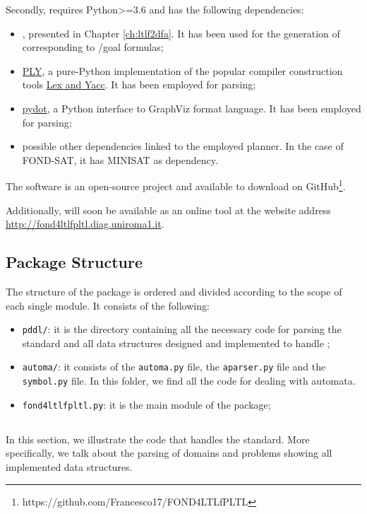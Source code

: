 Secondly, \FONDFOR requires Python>=3.6 and has the following dependencies:
\begin{itemize}
\item \LTLfToDFA, presented in Chapter \ref{ch:ltlf2dfa}. It has been used for the generation of \DFAs corresponding to \LTLf/\PLTL goal formulas;
\item \href{http://www.dabeaz.com/ply/ply.html}{PLY}, a pure-Python implementation of the popular compiler construction tools \href{http://dinosaur.compilertools.net/}{Lex and Yacc}. It has been employed for \PDDL parsing;
\item \href{https://pypi.org/project/pydot/}{pydot}, a Python interface to GraphViz format language. It has been employed for \DFAs parsing;
\item possible other dependencies linked to the employed planner. In the case of FOND-SAT, it has MINISAT as dependency.
\end{itemize} 
The \FONDFOR software is an open-source project and available to download on GitHub\footnote{https://github.com/Francesco17/FOND4LTLfPLTL}.

Additionally, \FONDFOR will soon be available as an online tool at the website address \href{http://fond4ltlfpltl.diag.uniroma1.it}{http://fond4ltlfpltl.diag.uniroma1.it}.
\subsection{Package Structure}
The structure of the \FONDFOR package is ordered and divided according to the scope of each single module. It consists of the following:
\begin{itemize}
\item \texttt{pddl/}: it is the directory containing all the necessary code for parsing the \PDDL standard and all data structures designed and implemented to handle \PDDL;
\item  \texttt{automa/}: it consists of the \texttt{automa.py} file, the \texttt{aparser.py} file and the \texttt{symbol.py} file. In this folder, we find all the code for dealing with automata.
\item \texttt{fond4ltlfpltl.py}: it is the main module of the package;
\end{itemize}
\subsection{\PDDL}
In this section, we illustrate the code that handles the \PDDL standard. More specifically, we talk about the parsing of \PDDL domains and problems showing all implemented data structures.

